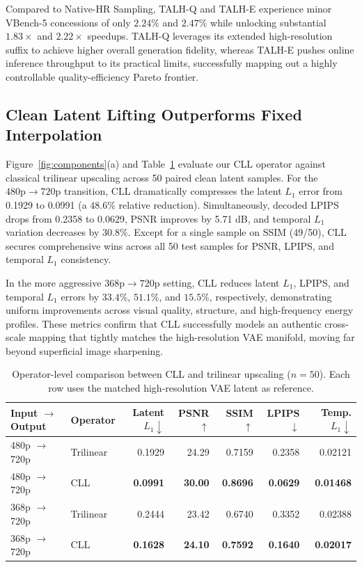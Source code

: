 Compared to Native-HR Sampling, TALH-Q and TALH-E experience minor
VBench-5 concessions of only \(2.24\%\) and \(2.47\%\) while unlocking
substantial \(1.83\times\) and \(2.22\times\) speedups. TALH-Q leverages
its extended high-resolution suffix to achieve higher overall generation
fidelity, whereas TALH-E pushes online inference throughput to its
practical limits, successfully mapping out a highly controllable
quality-efficiency Pareto frontier.

\subsection{Clean Latent Lifting Outperforms Fixed Interpolation}

Figure~\ref{fig:components}(a) and Table~\ref{tab:operator} evaluate our CLL operator against classical
trilinear upscaling across 50 paired clean latent samples. For the
\(480\text{p} \rightarrow 720\text{p}\) transition, CLL dramatically
compresses the latent \(L_1\) error from 0.1929 to 0.0991 (a \(48.6\%\)
relative reduction). Simultaneously, decoded LPIPS drops from 0.2358 to
0.0629, PSNR improves by 5.71 dB, and temporal \(L_1\) variation
decreases by \(30.8\%\). Except for a single sample on SSIM (49/50), CLL
secures comprehensive wins across all 50 test samples for PSNR, LPIPS,
and temporal \(L_1\) consistency.

In the more aggressive \(368\text{p} \rightarrow 720\text{p}\) setting,
CLL reduces latent \(L_1\), LPIPS, and temporal \(L_1\) errors by
\(33.4\%\), \(51.1\%\), and \(15.5\%\), respectively, demonstrating
uniform improvements across visual quality, structure, and
high-frequency energy profiles. These metrics confirm that CLL
successfully models an authentic cross-scale mapping that tightly
matches the high-resolution VAE manifold, moving far beyond superficial
image sharpening.

\begin{table}[t]
\centering
\small
\begin{tabular}{llrrrrr}
\toprule
Input $\rightarrow$ Output & Operator & Latent $L_1\downarrow$ & PSNR $\uparrow$ & SSIM $\uparrow$ & LPIPS $\downarrow$ & Temp. $L_1\downarrow$ \\
\midrule
480p $\rightarrow$ 720p & Trilinear & 0.1929 & 24.29 & 0.7159 & 0.2358 & 0.02121 \\
480p $\rightarrow$ 720p & CLL & \textbf{0.0991} & \textbf{30.00} & \textbf{0.8696} & \textbf{0.0629} & \textbf{0.01468} \\
368p $\rightarrow$ 720p & Trilinear & 0.2444 & 23.42 & 0.6740 & 0.3352 & 0.02388 \\
368p $\rightarrow$ 720p & CLL & \textbf{0.1628} & \textbf{24.10} & \textbf{0.7592} & \textbf{0.1640} & \textbf{0.02017} \\
\bottomrule
\end{tabular}
\caption{Operator-level comparison between CLL and trilinear upscaling
($n=50$). Each row uses the matched high-resolution VAE latent as
reference.}
\label{tab:operator}
\end{table}

